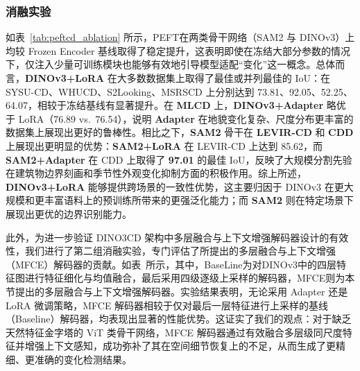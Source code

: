 \subsubsection{消融实验}

如表~\ref{tab:peftcd_ablation} 所示，PEFT在两类骨干网络（SAM2 与 DINOv3）上均较 Frozen Encoder 基线取得了稳定提升，这表明即使在冻结大部分参数的情况下，仅注入少量可训练模块也能够有效地引导模型适配“变化”这一概念。总体而言，\textbf{DINOv3+LoRA} 在大多数数据集上取得了最佳或并列最佳的 IoU：在 SYSU-CD、WHUCD、S2Looking、MSRSCD 上分别达到 73.81、92.05、52.25、64.07，相较于冻结基线有显著提升。在 \textbf{MLCD} 上，\textbf{DINOv3+Adapter} 略优于 LoRA（76.89 vs.\ 76.54），说明 \textbf{Adapter} 在地貌变化复杂、尺度分布更丰富的数据集上展现出更好的鲁棒性。相比之下，\textbf{SAM2} 骨干在 \textbf{LEVIR-CD} 和 \textbf{CDD} 上展现出更明显的优势：\textbf{SAM2+LoRA} 在 LEVIR-CD 上达到 85.62，而 \textbf{SAM2+Adapter} 在 CDD 上取得了 \textbf{97.01} 的最佳 IoU，反映了大规模分割先验在建筑物边界刻画和季节性外观变化抑制方面的积极作用。综上所述，\textbf{DINOv3+LoRA} 能够提供跨场景的一致性优势，这主要归因于 DINOv3 在更大规模和更丰富语料上的预训练所带来的更强泛化能力；而 \textbf{SAM2} 则在特定场景下展现出更优的边界识别能力。

此外，为进一步验证 DINO3CD 架构中多层融合与上下文增强解码器设计的有效性，我们进行了第二组消融实验，专门评估了所提出的多层融合与上下文增强（MFCE）解码器的贡献。如表~\label{tab:peftcd_dino3cd_ablation}所示，其中，BaseLine为对DINOv3中的四层特征图进行特征细化与均值融合，最后采用四级逐级上采样的解码器，MFCE则为本节提出的多层融合与上下文增强解码器。实验结果表明，无论采用 Adapter 还是 LoRA 微调策略，MFCE 解码器相较于仅对最后一层特征进行上采样的基线（Baseline）解码器，均表现出显著的性能优势。这证实了我们的观点：对于缺乏天然特征金字塔的 ViT 类骨干网络，MFCE 解码器通过有效融合多层级同尺度特征并增强上下文感知，成功弥补了其在空间细节恢复上的不足，从而生成了更精细、更准确的变化检测结果。

